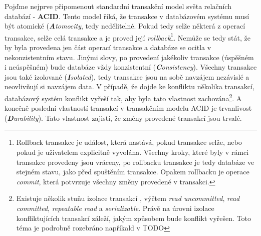 Pojďme nejprve připomenout standardní transakční model světa relačních databází - \textbf{ACID}. Tento model říká, že transakce v databázovém systému musí být atomické (\textit{\textbf{A}tomocity}, tedy nedělitelné. Pokud tedy selže některá z operací transakce, selže celá transakce a je proved její \textit{rollback}\footnote{Rollback transakce je událost, která nastává, pokud transakce selže, nebo pokud je uživatelem explicitně vyvolána. Všechny kroky, které byly v rámci transakce provedeny jsou vráceny, po rollbacku transakce je tedy databáze ve stejném stavu, jako před spuštěním transakce. Opakem rollbacku je operace \textit{commit}, která potvrzuje všechny změny provedené v transakci.}. Nemůže se tedy stát, že by byla provedena jen část operací transakce a databáze se ocitla v nekonzistentním stavu. Jinými slovy, po provedení jakékoliv transakce (úspěšném i neúspěšném) bude databáze vždy konzistentní (\textit{\textbf{C}onsistency}). Všechny transakce jsou také izolované (\textit{\textbf{I}solated}), tedy transakce jsou na sobě navzájem nezávislé a neovlivňují si navzájem data. V případě, že dojde ke konfliktu několika transakcí, databázový systém konflikt vyřeší tak, aby byla tato vlastnost zachována\footnote{Existuje několik stuňu izolace transakcí , výčtem \textit{read uncommitted}, \textit{read committed}, \textit{repeatable read} a \textit{serializable}. Právě na úrovni izolace konfliktujících transakcí záleží, jakým způsobem bude konflikt vyřešen. Toto téma je podrobně rozebráno napříkald v TODO}. A konečně poslední vlastností transakcí v transakčním modelu ACID je trvanlivost (\textit{\textbf{D}urability}). Tato vlastnost zajistí, že změny provedené transakcí jsou trvalé. 

